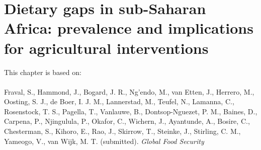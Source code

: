 \chapter[Dietary gaps in sub-Saharan Africa: prevalence and implications for agricultural interventions]{Dietary gaps in sub-Saharan Africa: prevalence and implications for agricultural interventions}
\label{cha:chapter6}
\vspace*{\fill}
This chapter is based on:
\\
\\
Fraval, S., Hammond, J., Bogard, J. R., Ng'endo, M., van Etten, J., Herrero, M., Oosting, S. J., de Boer, I. J. M., Lannerstad, M., Teufel, N., Lamanna, C., Rosenstock, T. S., Pagella, T., Vanlauwe, B., Dontsop-Nguezet, P. M., Baines, D., Carpena, P., Njingulula, P., Okafor, C., Wichern, J., Ayantunde, A., Bosire, C., Chesterman, S., Kihoro, E., Rao, J., Skirrow, T., Steinke, J., Stirling, C. M., Yameogo, V., van Wijk, M. T. (submitted). \textit{Global Food Security}

\newpage

